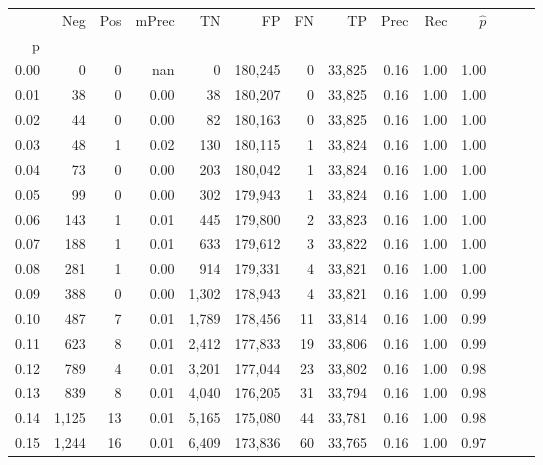 \begin{tabular}{rrrrrrrrrrrrrr}
\toprule
{} &    Neg &  Pos & mPrec &       TN &       FP &      FN &      TP &  Prec &   Rec & $\hat{p}$ \\
p    &        &      &       &          &          &         &         &       &       &           \\
\midrule
0.00 &      0 &    0 &   nan &        0 &  180,245 &       0 &  33,825 &  0.16 &  1.00 &      1.00 \\
0.01 &     38 &    0 &  0.00 &       38 &  180,207 &       0 &  33,825 &  0.16 &  1.00 &      1.00 \\
0.02 &     44 &    0 &  0.00 &       82 &  180,163 &       0 &  33,825 &  0.16 &  1.00 &      1.00 \\
0.03 &     48 &    1 &  0.02 &      130 &  180,115 &       1 &  33,824 &  0.16 &  1.00 &      1.00 \\
0.04 &     73 &    0 &  0.00 &      203 &  180,042 &       1 &  33,824 &  0.16 &  1.00 &      1.00 \\
0.05 &     99 &    0 &  0.00 &      302 &  179,943 &       1 &  33,824 &  0.16 &  1.00 &      1.00 \\
0.06 &    143 &    1 &  0.01 &      445 &  179,800 &       2 &  33,823 &  0.16 &  1.00 &      1.00 \\
0.07 &    188 &    1 &  0.01 &      633 &  179,612 &       3 &  33,822 &  0.16 &  1.00 &      1.00 \\
0.08 &    281 &    1 &  0.00 &      914 &  179,331 &       4 &  33,821 &  0.16 &  1.00 &      1.00 \\
0.09 &    388 &    0 &  0.00 &    1,302 &  178,943 &       4 &  33,821 &  0.16 &  1.00 &      0.99 \\
0.10 &    487 &    7 &  0.01 &    1,789 &  178,456 &      11 &  33,814 &  0.16 &  1.00 &      0.99 \\
0.11 &    623 &    8 &  0.01 &    2,412 &  177,833 &      19 &  33,806 &  0.16 &  1.00 &      0.99 \\
0.12 &    789 &    4 &  0.01 &    3,201 &  177,044 &      23 &  33,802 &  0.16 &  1.00 &      0.98 \\
0.13 &    839 &    8 &  0.01 &    4,040 &  176,205 &      31 &  33,794 &  0.16 &  1.00 &      0.98 \\
0.14 &  1,125 &   13 &  0.01 &    5,165 &  175,080 &      44 &  33,781 &  0.16 &  1.00 &      0.98 \\
0.15 &  1,244 &   16 &  0.01 &    6,409 &  173,836 &      60 &  33,765 &  0.16 &  1.00 &      0.97 \\

\end{tabular}
